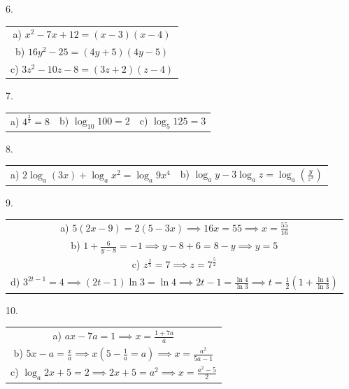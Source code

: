 \documentclass{article}
\begin{document}
6.

\begin{center}
  \begin{tabular}{ c }
    a) $x^2-7x+12 = (x-3)(x-4)$ \\ b) $16y^2-25 = (4y+5)(4y-5)$ \\ c) $3z^2-10z-8 = (3z+2)(z-4)$
  \end{tabular}
\end{center}

7.

\begin{center}
  \begin{tabular}{ c c c }
    a) $4^{\frac{3}{2}} = 8$ & b) $\log_{10}100 = 2$ & c) $\log_{5}125 = 3$
  \end{tabular}
\end{center}

8.

\begin{center}
  \begin{tabular}{ c c }
    a) $2\log_a(3x)+\log_ax^2 = \log_a9x^4$ & b) $\log_ay-3\log_az = \log_a\left( \frac{y}{z^3} \right)$
  \end{tabular}
\end{center}

9.

\begin{center}
  \begin{tabular}{ c }
    a) $5(2x-9) = 2(5-3x) \implies 16x = 55 \implies x = \frac{55}{16}$ \\
    b) $1+\frac{6}{y-8} = -1 \implies y-8 + 6 = 8 - y \implies y = 5$ \\
    c) $z^{\frac{2}{5}}=7 \implies z=7^{\frac{5}{2}}$ \\
    d) $3^{2t-1}=4 \implies (2t-1)\ln{3}=\ln{4} \implies 2t-1 = \frac{\ln{4}}{\ln{3}} \implies t = \frac{1}{2}\left( 1+\frac{\ln{4}}{\ln{3}} \right)$
  \end{tabular}
\end{center}

10.

\begin{center}
  \begin{tabular}{ c }
    a) $ax-7a=1 \implies x=\frac{1+7a}{a}$ \\
    b) $5x-a = \frac{x}{a} \implies x\left( 5-\frac{1}{a}=a \right) \implies x = \frac{a^2}{5a-1}$ \\
    c) $\log_a{2x+5} = 2 \implies 2x+5 = a^2 \implies x = \frac{a^2-5}{2}$
  \end{tabular}
\end{center}
\end{document}
